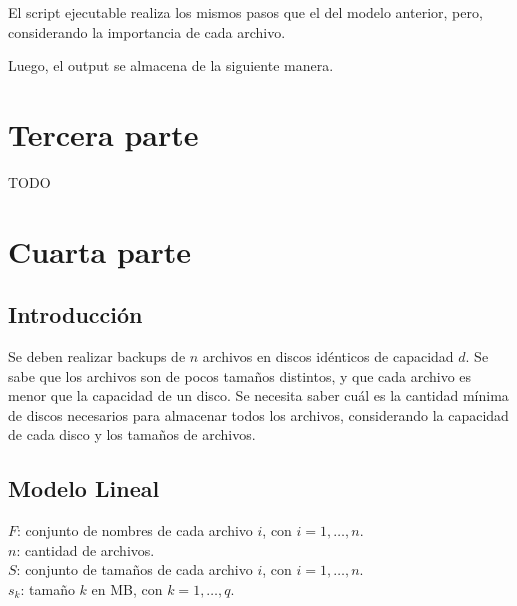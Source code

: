 \documentclass[11pt, a4paper, pdftex]{article}
\begin{document}


\newpage

El script ejecutable realiza los mismos pasos que el del modelo anterior, pero, considerando 
la importancia de cada archivo.



\newpage

Luego, el output se almacena de la siguiente manera.



\section{Tercera parte}

TODO

\section{Cuarta parte}

\subsection{Introducción}

Se deben realizar backups de $n$ archivos en discos idénticos de
capacidad $d$.  Se sabe que los archivos son de pocos tamaños distintos,
y que cada archivo es menor que la capacidad de un disco. Se necesita
saber cuál es la cantidad mínima de discos necesarios para almacenar
todos los archivos, considerando la capacidad de cada disco y los
tamaños de archivos.

\subsection{Modelo Lineal}

$F$: conjunto de nombres de cada archivo $i$, con $i = 1, \ldots, n$. \\

$n$: cantidad de archivos. \\

$S$: conjunto de tamaños de cada archivo $i$, con $i = 1, \ldots, n$. \\

$s_{k}$: tamaño $k$ en MB, con $k = 1, \ldots, q$. \\
\end{document}
